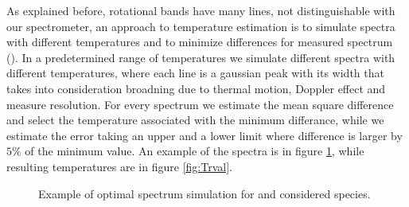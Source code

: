 As explained before, rotational bands have many lines, not distinguishable with our spectrometer, an approach to temperature estimation is to simulate spectra with different temperatures and to minimize differences for measured spectrum (\cite{Izarra_2000}).
In a predetermined range of temperatures we simulate different spectra with different temperatures, where each line is a gaussian peak with its width that takes into consideration broadning due to thermal motion, Doppler effect and measure resolution. For every spectrum we estimate the mean square difference and select the temperature associated with the minimum differance, while we estimate the error taking an upper and a lower limit where difference is larger by $5\%$ of the minimum value. An example of the spectra is in figure \ref{fig:Trfit}, while resulting temperatures are in figure \ref{fig:Trval}.
\begin{figure}
\centering
  \hfill
 \caption{Example of optimal spectrum simulation for  and  considered species.}
 \label{fig:Trfit}
\end{figure}



